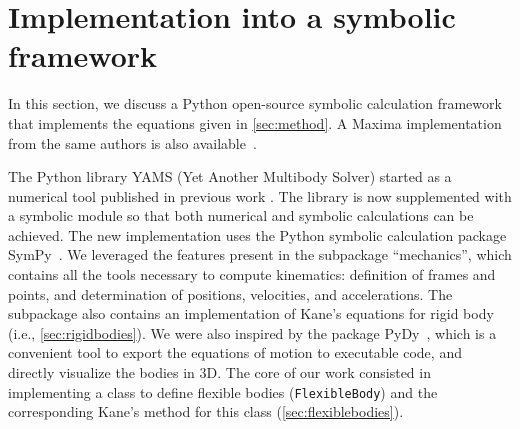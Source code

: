 \documentclass[wes, manuscript]{copernicus}
\begin{document}
\section{Implementation into a symbolic framework}
\label{sec:implementation}
In this section, we discuss a Python open-source symbolic calculation framework that implements the equations given in \autoref{sec:method}. 
A Maxima implementation from the same authors is also available~\cite{CADynTurb}.

The Python library YAMS (Yet Another Multibody Solver) started as a numerical tool published in previous work \citep{branlard:2019flex}.
The library is now supplemented with a symbolic module so that both numerical and symbolic calculations can be achieved.
The new implementation uses the Python symbolic calculation package SymPy~\citep{sympy}.
We leveraged the features present in the subpackage ``mechanics'', which contains all the tools necessary to compute kinematics: definition of frames and points, and determination of positions, velocities, and accelerations. The subpackage also contains an implementation of Kane's equations for rigid body (i.e., \autoref{sec:rigidbodies}).
We were also inspired by the package PyDy~\citep{Gede:2013}, which is a convenient tool to export the equations of motion to executable code, and directly visualize the bodies in 3D.
The core of our work consisted in implementing a class to define flexible bodies (\texttt{FlexibleBody}) and the corresponding Kane's method for this class (\autoref{sec:flexiblebodies}).  
\end{document}
